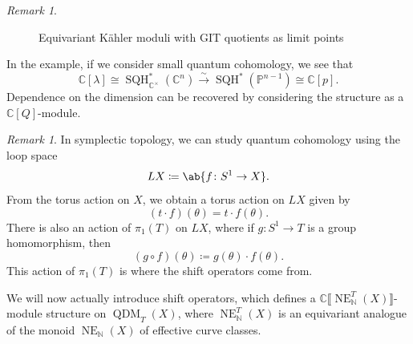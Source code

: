 \documentclass{amsart}
\theoremstyle{definition}
\theoremstyle{remark}
\newtheorem{rmk}[thm]{Remark}
\theoremstyle{plain}
\theoremstyle{definition}
\theoremstyle{remark}
\newcommand{\N}{\mathbb{N}}
\newcommand{\C}{\mathbb{C}}
\renewcommand{\P}{\mathbb{P}}
\newcommand{\on}[1]{\operatorname{#1}}
\newcommand{\1}{\mathbf{1}}
\newcommand{\2}{\mathbf{2}}
\newcommand{\3}{\mathbf{3}}
\newcommand{\ps}[1]{\lBrack #1 \rBrack}
\DeclareMathOperator{\QDM}{QDM}
\begin{document}
\begin{rmk}
\begin{figure}[H]
        \caption{Equivariant K\"ahler moduli with GIT quotients as limit points}
        \label{fig:kahlermoduli}
    \end{figure}

    In the example, if we consider small quantum cohomology, we see that
    \[ \C[\lambda] \cong \on{SQH}_{\C^{\times}}^* (\C^n) \xrightarrow{\sim} \on{SQH}^*(\P^{n-1}) \cong \C[p]. \]
    Dependence on the dimension can be recovered by considering the structure as a \(\C[Q]\)-module.
\end{rmk}

\begin{rmk}
    In symplectic topology, we can study quantum cohomology using the loop space
    \[ LX \coloneqq \ab\{ f \colon S^1 \to X \}. \]
    From the torus action on \(X\), we obtain a torus action on \(LX\) given by
    \[ (t \cdot f)(\theta) = t \cdot f(\theta). \]
    There is also an action of \(\pi_1(T)\) on \(LX\), where if \(g \colon S^1 \to T\) is a group homomorphism, then
    \[ (g \circ f)(\theta) \coloneqq g(\theta) \cdot f(\theta). \]
    This action of \(\pi_1(T)\) is where the shift operators come from.
\end{rmk}

We will now actually introduce shift operators, which defines a \(\C\ps{\on{NE}_{\N}^T(X)}\)-module structure on \(\QDM_T(X)\), where \(\on{NE}_{\N}^T(X)\) is an equivariant analogue of the monoid \(\on{NE}_{\N}(X)\) of effective curve classes.
\end{document}
